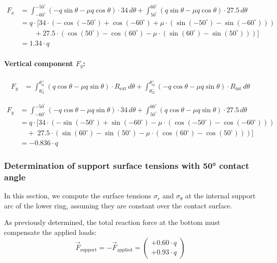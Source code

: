 \documentclass[12pt]{article}
\begin{document}
\begin{align*}
F_x &=
\int_{-60^\circ}^{-50^\circ} (-q \sin\theta - \mu q \cos\theta) \cdot 34 \, d\theta
+
\int_{50^\circ}^{60^\circ} (q \sin\theta - \mu q \cos\theta) \cdot 27.5 \, d\theta \\
&= q \cdot \Big[
34 \cdot \left( -\cos(-50^\circ) + \cos(-60^\circ) + \mu \cdot (\sin(-50^\circ) - \sin(-60^\circ)) \right) \\
&\qquad + 27.5 \cdot \left( \cos(50^\circ) - \cos(60^\circ) - \mu \cdot (\sin(60^\circ) - \sin(50^\circ)) \right)
\Big] \\
&= \boxed{1.34 \cdot q}
\end{align*}


\paragraph{Vertical component \( F_y \):}
\begin{align}
F_y &=
\int_{\theta_{t1}^-}^{\theta_{t1}^+} (q \cos\theta - \mu q \sin\theta) \cdot R_{\text{ext}} \, d\theta
+
\int_{\theta_{t2}^-}^{\theta_{t2}^+} (-q \cos\theta - \mu q \sin\theta) \cdot R_{\text{int}} \, d\theta
\tag{2.27}
\end{align}

\begin{align*}
F_y &=
\int_{-60^\circ}^{-50^\circ} (-q \cos\theta - \mu q \sin\theta) \cdot 34 \, d\theta
+
\int_{50^\circ}^{60^\circ} (q \cos\theta - \mu q \sin\theta) \cdot 27.5 \, d\theta \\
&= q \cdot \Big[
34 \cdot \left( -\sin(-50^\circ) + \sin(-60^\circ) - \mu \cdot (\cos(-50^\circ) - \cos(-60^\circ)) \right) \\
&\quad + \; 27.5 \cdot \left( \sin(60^\circ) - \sin(50^\circ) - \mu \cdot (\cos(60^\circ) - \cos(50^\circ)) \right)
\Big] \\
&= \boxed{-0.836 \cdot q}
\end{align*}


\subsubsection{Determination of support surface tensions with 50° contact angle}

In this section, we compute the surface tensions $\sigma_r$ and $\sigma_\theta$ at the internal support arc of the lower ring, assuming they are constant over the contact surface.

As previously determined, the total reaction force at the bottom must compensate the applied loads:
\[
\vec{F}_{\text{support}} = -\vec{F}_{\text{applied}} =
\begin{pmatrix}
+0.60 \cdot q \\
+0.93 \cdot q
\end{pmatrix}
\]
\end{document}
